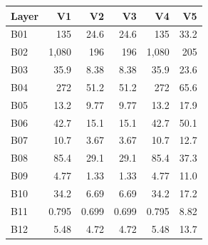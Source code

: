\begin{tabular}{lrrrrr}
\hline
\rowcolor{headgrey}
\textbf{Layer} & \textbf{V1} & \textbf{V2} & \textbf{V3} & \textbf{V4} & \textbf{V5} \\ \hline
B01 & 135 & 24.6 & 24.6 & 135 & 33.2 \\
B02 & 1{,}080 & 196 & 196 & 1{,}080 & 205 \\
B03 & 35.9 & 8.38 & 8.38 & 35.9 & 23.6 \\
B04 & 272 & 51.2 & 51.2 & 272 & 65.6 \\
B05 & 13.2 & 9.77 & 9.77 & 13.2 & 17.9 \\
B06 & 42.7 & 15.1 & 15.1 & 42.7 & 50.1 \\
B07 & 10.7 & 3.67 & 3.67 & 10.7 & 12.7 \\
B08 & 85.4 & 29.1 & 29.1 & 85.4 & 37.3 \\
B09 & 4.77 & 1.33 & 1.33 & 4.77 & 11.0 \\
B10 & 34.2 & 6.69 & 6.69 & 34.2 & 17.2 \\
B11 & 0.795 & 0.699 & 0.699 & 0.795 & 8.82 \\
B12 & 5.48 & 4.72 & 4.72 & 5.48 & 13.7 \\
\hline
\end{tabular}
